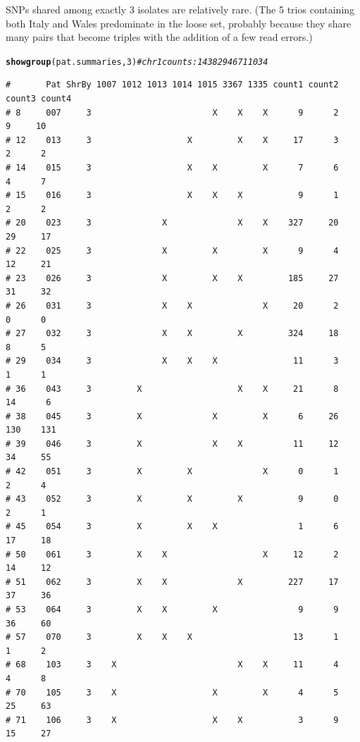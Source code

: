 \documentclass{article}\usepackage[]{graphicx}\usepackage[]{color}
\makeatletter
\newcommand{\hlnum}[1]{\textcolor[rgb]{0.686,0.059,0.569}{#1}}%
\newcommand{\hlcom}[1]{\textcolor[rgb]{0.678,0.584,0.686}{\textit{#1}}}%
\newcommand{\hlstd}[1]{\textcolor[rgb]{0.345,0.345,0.345}{#1}}%
\newcommand{\hlkwd}[1]{\textcolor[rgb]{0.737,0.353,0.396}{\textbf{#1}}}%
\newenvironment{kframe}{%
 \def\at@end@of@kframe{}%
 \ifinner\ifhmode%
  \def\at@end@of@kframe{\end{minipage}}%
  \begin{minipage}{\columnwidth}%
 \fi\fi%
 \def\FrameCommand##1{\hskip\@totalleftmargin \hskip-\fboxsep
 \colorbox{shadecolor}{##1}\hskip-\fboxsep
     \hskip-\linewidth \hskip-\@totalleftmargin \hskip\columnwidth}%
 \MakeFramed {\advance\hsize-\width
   \@totalleftmargin\z@ \linewidth\hsize
   \@setminipage}}%
 {\par\unskip\endMakeFramed%
 \at@end@of@kframe}
\newenvironment{knitrout}{}{} %
\makeatother
\begin{document}
SNPs shared among exactly 3 isolates are relatively rare.  (The 5 trios containing both Italy and Wales predominate in
the loose set, probably because they share many pairs that become triples with the addition of a few read errors.)

\begin{knitrout}\footnotesize
{}\color{fgcolor}\begin{kframe}
\begin{alltt}
\hlkwd{showgroup}\hlstd{(pat.summaries,}\hlnum{3}\hlstd{)} \hlcom{# chr 1 counts: 1438    294    671  1034}
\end{alltt}
\begin{verbatim}
#       Pat ShrBy 1007 1012 1013 1014 1015 3367 1335 count1 count2 count3 count4
# 8     007     3                        X    X    X      9      2      9     10
# 12    013     3                   X         X    X     17      3      2      2
# 14    015     3                   X    X         X      7      6      4      7
# 15    016     3                   X    X    X           9      1      2      2
# 20    023     3              X              X    X    327     20     29     17
# 22    025     3              X         X         X      9      4     12     21
# 23    026     3              X         X    X         185     27     31     32
# 26    031     3              X    X              X     20      2      0      0
# 27    032     3              X    X         X         324     18      8      5
# 29    034     3              X    X    X               11      3      1      1
# 36    043     3         X                   X    X     21      8     14      6
# 38    045     3         X              X         X      6     26    130    131
# 39    046     3         X              X    X          11     12     34     55
# 42    051     3         X         X              X      0      1      2      4
# 43    052     3         X         X         X           9      0      2      1
# 45    054     3         X         X    X                1      6     17     18
# 50    061     3         X    X                   X     12      2     14     12
# 51    062     3         X    X              X         227     17     37     36
# 53    064     3         X    X         X                9      9     36     60
# 57    070     3         X    X    X                    13      1      1      2
# 68    103     3    X                        X    X     11      4      4      8
# 70    105     3    X                   X         X      4      5     25     63
# 71    106     3    X                   X    X           3      9     15     27

\end{verbatim}
\end{kframe}
\end{knitrout}
\end{document}

